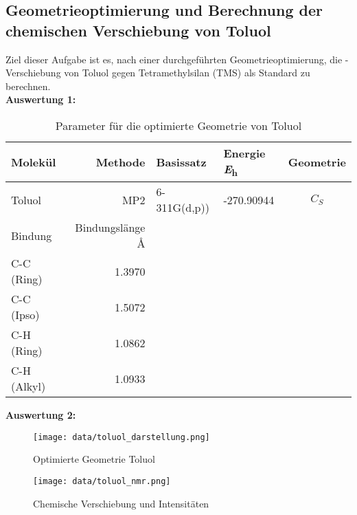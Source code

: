 \documentclass[12pt]{article}
\begin{document}
\begin{onehalfspace}

\section{Geometrieoptimierung und Berechnung der chemischen Verschiebung von Toluol}
Ziel dieser Aufgabe ist es, nach einer durchgeführten Geometrieoptimierung, die -Verschiebung von Toluol gegen Tetramethylsilan (TMS) als Standard zu berechnen.\\
\textbf{Auswertung 1:}\\

\begin{table}[!htpb]
\centering
\caption{ Parameter für die optimierte Geometrie von Toluol}
\begin{tabular}{lrllc}
\toprule
Molekül  & Methode & Basissatz & Energie \si{\hartree} & Geometrie \\
\midrule
 Toluol & MP2 & 6-311G(d,p))& -270.90944 &$C _S$\\
\midrule
 Bindung & Bindungslänge \si{\angstrom} & &  &\\
 C-C (Ring) & 1.3970 &&&\\
 C-C (Ipso) & 1.5072 &&&\\
 C-H (Ring) & 1.0862 &&&\\
 C-H (Alkyl)& 1.0933 &&&\\
\bottomrule
\end{tabular}
\end{table}

\textbf{Auswertung 2:}\\

\begin{figure}[!htpb]
\centering
  \texttt{[image: data/toluol\_darstellung.png]}%
  \caption{Optimierte Geometrie Toluol}
\end{figure}
\begin{figure}[!htbp]
\centering
  \texttt{[image: data/toluol\_nmr.png]}%
  \caption{Chemische Verschiebung und Intensitäten}
\end{figure}


\end{onehalfspace}
\end{document}
